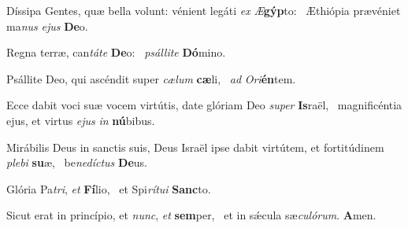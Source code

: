 \item Díssipa Gentes, quæ bella volunt: vénient legáti \textit{ex} \textit{Æ}\textbf{gýp}to:~\psstar{} Æthiópia prævéniet ma\textit{nus} \textit{ejus} \textbf{De}o.

\item Regna terræ, can\textit{táte} \textbf{De}o:~\psstar{} \textit{psállite} \textbf{Dó}mino.

\item Psállite Deo, qui ascéndit super \textit{cælum} \textbf{cæ}li,~\psstar{} \textit{ad} \textit{Ori}\textbf{én}tem.

\item Ecce dabit voci suæ vocem virtútis, date glóriam Deo \textit{super} \textbf{Is}raël,~\psstar{} magnificéntia ejus, et virtus \textit{ejus} \textit{in} \textbf{nú}bibus.

\item Mirábilis Deus in sanctis suis, Deus Israël ipse dabit virtútem, et fortitúdinem \textit{plebi} \textbf{su}æ,~\psstar{} be\textit{nedíctus} \textbf{De}us.

\item Glória Pa\textit{tri}, \textit{et} \textbf{Fí}lio,~\psstar{} et Spi\textit{rítui} \textbf{Sanc}to.

\item Sicut erat in princípio, et \textit{nunc}, \textit{et} \textbf{sem}per,~\psstar{} et in sǽcula sæ\textit{culórum}. \textbf{A}men.
